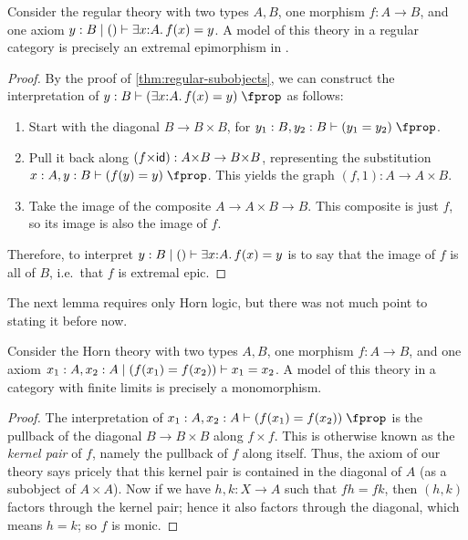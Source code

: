 \begin{lem}\label{thm:logic-extremal-epi}
  Consider the regular theory with two types $A,B$, one morphism $f:A\to B$, and one axiom $y:B \cb \ec \types \exists x:A.f(x)= y$.
  A model of this theory in a regular category \cS is precisely an extremal epimorphism in \cS.
\end{lem}
\begin{proof}
  By the proof of \cref{thm:regular-subobjects}, we can construct the interpretation of $y:B\types (\exists x:A.f(x)= y)\prop$ as follows:
  \begin{enumerate}
  \item Start with the diagonal $B\to B\times B$, for $y_1:B,y_2:B\types (y_1= y_2)\prop$.
  \item Pull it back along $(f\times \idfunc):A\times B\to B\times B$, representing the substitution $x:A,y:B\types (f(y)= y)\prop$.
    This yields the graph $(f,1):A\to A\times B$.
  \item Take the image of the composite $A\to A\times B \to B$.
    This composite is just $f$, so its image is also the image of $f$.
  \end{enumerate}
  Therefore, to interpret $y:B \cb \ec \types \exists x:A.f(x)= y$ is to say that the image of $f$ is all of $B$, i.e.\ that $f$ is extremal epic.
\end{proof}

The next lemma requires only Horn logic, but there was not much point to stating it before now.

\begin{lem}\label{thm:logic-mono}
  Consider the Horn theory with two types $A,B$, one morphism $f:A\to B$, and one axiom $x_1:A,x_2:A \mid (f(x_1)=f(x_2)) \vdash x_1=x_2$.
  A model of this theory in a category with finite limits is precisely a monomorphism.
\end{lem}
\begin{proof}
  The interpretation of $x_1:A,x_2:A \types (f(x_1)=f(x_2))\prop$ is the pullback of the diagonal $B\to B\times B$ along $f\times f$.
  This is otherwise known as the \emph{kernel pair} of $f$, namely the pullback of $f$ along itself.
  Thus, the axiom of our theory says pricely that this kernel pair is contained in the diagonal of $A$ (as a subobject of $A\times A$).
  Now if we have $h,k:X\to A$ such that $f h = f k$, then $(h,k)$ factors through the kernel pair; hence it also factors through the diagonal, which means $h=k$; so $f$ is monic.
\end{proof}

